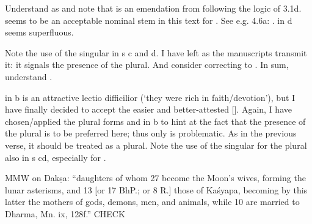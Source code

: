 { Understand  as  and note that  is an emendation from                  following the logic of 3.1d.                   seems to be an acceptable nominal stem in this text for . See                 e.g. 4.6a: .   in  d seems superfluous. }





{ Note the use of the singular in s c and d. I have left  as the         manuscripts transmit it: it signals the presence of the plural. And consider          correcting  to . In sum,                  understand . }





{  in  b is an attractive lectio difficilior (`they were rich in faith/devotion'), but I have finally                  decided to accept the easier and better-attested [].  Again, I have chosen/applied the plural forms  and  in  b to hint at the fact                         that the presence of the plural is to be preferred here; thus only  is                          problematic. As  in the previous verse, it should be treated as a plural.         Note the use of the singular for the plural also in s cd, especially  for .          

         MMW on Dakṣa:         ``daughters of whom 27 become the Moon's wives, forming the lunar asterisms, and 13          [or 17 BhP.; or 8 R.] those of Kaśyapa, becoming by this latter the mothers          of gods, demons, men, and animals, while 10 are married to Dharma, Mn. ix, 128f.'' CHECK }





